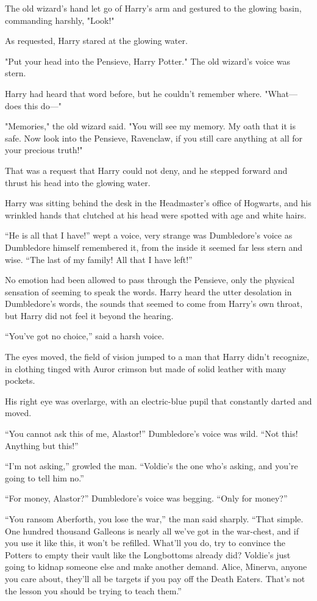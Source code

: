 The old wizard's hand let go of Harry's arm and gestured to the glowing basin,
commanding harshly, "Look!"

As requested, Harry stared at the glowing water.

"Put your head into the Pensieve, Harry Potter." The old wizard's voice was
stern.

Harry had heard that word before, but he couldn't remember where. "What—does
this do—"

"Memories," the old wizard said. "You will see my memory. My oath that it is
safe. Now look into the Pensieve, Ravenclaw, if you still care anything at all
for your precious truth!"

That was a request that Harry could not deny, and he stepped forward and thrust
his head into the glowing water.
\sbreak
\begin{em}
Harry was sitting behind the desk in the Headmaster's office of Hogwarts,
and his wrinkled hands that clutched at his head were spotted with age and
white hairs.

``He is all that I have!'' wept a voice, very strange was Dumbledore's
voice as Dumbledore himself remembered it, from the inside it seemed far less
stern and wise. ``The last of my family! All that I have left!''

No emotion had been allowed to pass through the Pensieve, only the
physical sensation of seeming to speak the words. Harry heard the utter
desolation in Dumbledore's words, the sounds that seemed to come from Harry's
own throat, but Harry did not feel it beyond the hearing.

``You've got no choice,'' said a harsh voice.

The eyes moved, the field of vision jumped to a man that Harry didn't
recognize, in clothing tinged with Auror crimson but made of solid leather with
many pockets.

His right eye was overlarge, with an electric-blue pupil that constantly
darted and moved.

``You cannot ask this of me, Alastor!'' Dumbledore's voice was wild. ``Not
this! Anything but this!''

``I'm not asking,'' growled the man. ``Voldie's the one who's asking, and
you're going to tell him no.''

``For money, Alastor?'' Dumbledore's voice was begging. ``Only for money?''

``You ransom Aberforth, you lose the war,'' the man said sharply. ``That
simple. One hundred thousand Galleons is nearly all we've got in the war-chest,
and if you use it like this, it won't be refilled. What'll you do, try to
convince the Potters to empty their vault like the Longbottoms already did?
Voldie's just going to kidnap someone else and make another demand. Alice,
Minerva, anyone you care about, they'll all be targets if you pay off the Death
Eaters. That's not the lesson you should be trying to teach them.''


\end{em}

